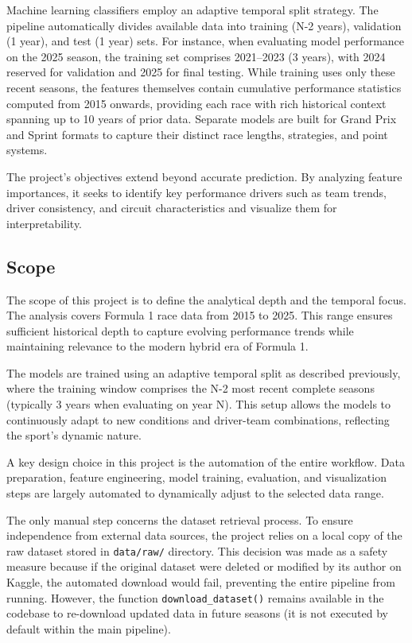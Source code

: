 \documentclass[11pt,a4paper]{article}
\begin{document}
Machine learning classifiers employ an adaptive temporal split strategy. The pipeline automatically divides available data into training (N-2 years), validation (1 year), and test (1 year) sets. For instance, when evaluating model performance on the 2025 season, the training set comprises 2021–2023 (3 years), with 2024 reserved for validation and 2025 for final testing. While training uses only these recent seasons, the features themselves contain cumulative performance statistics computed from 2015 onwards, providing each race with rich historical context spanning up to 10 years of prior data. Separate models are built for Grand Prix and Sprint formats to capture their distinct race lengths, strategies, and point systems.

The project’s objectives extend beyond accurate prediction. By analyzing feature importances, it seeks to identify key performance drivers such as team trends, driver consistency, and circuit characteristics and visualize them for interpretability.

\subsection{Scope}
\label{subsec:scope}

The scope of this project is to define the analytical depth and the temporal focus. The analysis covers Formula 1 race data from 2015 to 2025. This range ensures sufficient historical depth to capture evolving performance trends while maintaining relevance to the modern hybrid era of Formula 1.

The models are trained using an adaptive temporal split as described previously, where the training window comprises the N-2 most recent complete seasons (typically 3 years when evaluating on year N). This setup allows the models to continuously adapt to new conditions and driver-team combinations, reflecting the sport's dynamic nature.

A key design choice in this project is the automation of the entire workflow. Data preparation, feature engineering, model training, evaluation, and visualization steps are largely automated to dynamically adjust to the selected data range.

The only manual step concerns the dataset retrieval process. To ensure independence from external data sources, the project relies on a local copy of the raw dataset stored in \texttt{data/raw/} directory. This decision was made as a safety measure because if the original dataset were deleted or modified by its author on Kaggle, the automated download would fail, preventing the entire pipeline from running. However, the function \texttt{download\_dataset()} remains available in the codebase to re-download updated data in future seasons (it is not executed by default within the main pipeline).
\end{document}
